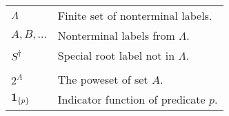 \begin{table}[h]
\begin{tabular}{ll}
    $\Lambda$ & Finite set of nonterminal labels.  \\
    $A, B, \dots$ & Nonterminal labels from $\Lambda$.  \\
    $S^{\dagger}$ & Special root label not in $\Lambda$.  \\
    & \\

    $2^A$ & The poweset of set $A$.  \\
    $\mathbf{1}_{ \{ p \} }$  & Indicator function of predicate $p$.  \\

  \end{tabular}

\end{table}

% 

